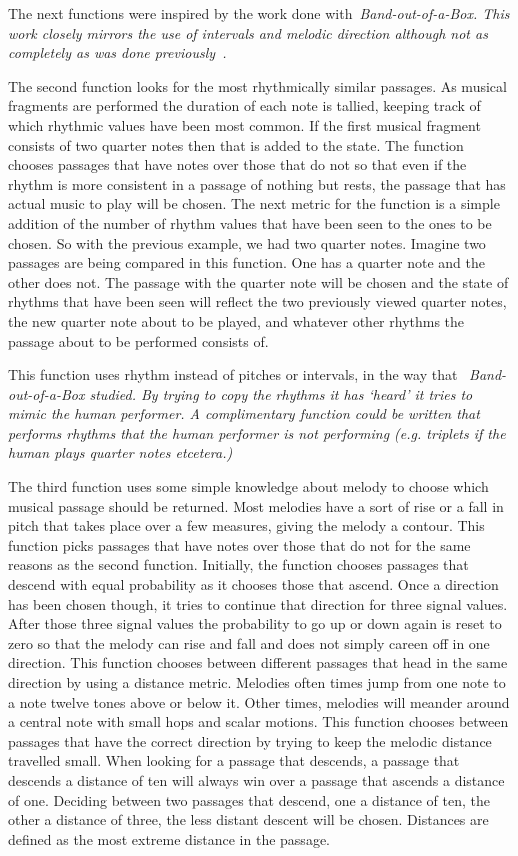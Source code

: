 \documentclass[12pt]{ucthesis}
\begin{document}
The next functions were inspired by the work done with~\em{Band-out-of-a-Box. }\em This work closely mirrors the use of intervals and melodic direction although not as completely as was done previously~\cite{bob}.

The second function looks for the most rhythmically similar passages. As musical fragments are performed the duration of each note is tallied, keeping track of which rhythmic values have been most common. If the first musical fragment consists of two quarter notes then that is added to the state. The function chooses passages that have notes over those that do not so that even if the rhythm is more consistent in a passage of nothing but rests, the passage that has actual music to play will be chosen. The next metric for the function is a simple addition of the number of rhythm values that have been seen to the ones to be chosen. So with the previous example, we had two quarter notes. Imagine two passages are being compared in this function. One has a quarter note and the other does not. The passage with the quarter note will be chosen and the state of rhythms that have been seen will reflect the two previously viewed quarter notes, the new quarter note about to be played, and whatever other rhythms the passage about to be performed consists of.

This function uses rhythm instead of pitches or intervals, in the way that ~\em{Band-out-of-a-Box }\em studied. By trying to copy the rhythms it has `heard' it tries to mimic the human performer. A complimentary function could be written that performs rhythms that the human performer is not performing (e.g. triplets if the human plays quarter notes etcetera.)

The third function uses some simple knowledge about melody to choose which musical passage should be returned. Most melodies have a sort of rise or a fall in pitch that takes place over a few measures, giving the melody a contour. This function picks passages that have notes over those that do not for the same reasons as the second function. Initially, the function chooses passages that descend with equal probability as it chooses those that ascend. Once a direction has been chosen though, it tries to continue that direction for three signal values. After those three signal values the probability to go up or down again is reset to zero so that the melody can rise and fall and does not simply careen off in one direction. This function chooses between different passages that head in the same direction by using a distance metric. Melodies often times jump from one note to a note twelve tones above or below it. Other times, melodies will meander around a central note with small hops and scalar motions. This function chooses between passages that have the correct direction by trying to keep the melodic distance travelled small. When looking for a passage that descends, a passage that descends a distance of ten will always win over a passage that ascends a distance of one. Deciding between two passages that descend, one a distance of ten, the other a distance of three, the less distant descent will be chosen. Distances are defined as the most extreme distance in the passage.
\end{document}
